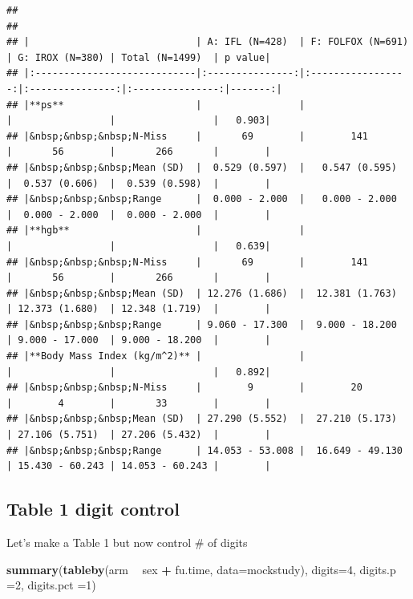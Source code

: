 \documentclass[
]{book}
\newenvironment{Shaded}{\begin{snugshade}}{\end{snugshade}}
\newcommand{\DataTypeTok}[1]{\textcolor[rgb]{0.13,0.29,0.53}{#1}}
\newcommand{\DecValTok}[1]{\textcolor[rgb]{0.00,0.00,0.81}{#1}}
\newcommand{\KeywordTok}[1]{\textcolor[rgb]{0.13,0.29,0.53}{\textbf{#1}}}
\newcommand{\NormalTok}[1]{#1}
\newcommand{\OperatorTok}[1]{\textcolor[rgb]{0.81,0.36,0.00}{\textbf{#1}}}
\newcommand{\StringTok}[1]{\textcolor[rgb]{0.31,0.60,0.02}{#1}}
\begin{document}
\begin{verbatim}
## 
## 
## |                             | A: IFL (N=428)  | F: FOLFOX (N=691) | G: IROX (N=380) | Total (N=1499)  | p value|
## |:----------------------------|:---------------:|:-----------------:|:---------------:|:---------------:|-------:|
## |**ps**                       |                 |                   |                 |                 |   0.903|
## |&nbsp;&nbsp;&nbsp;N-Miss     |       69        |        141        |       56        |       266       |        |
## |&nbsp;&nbsp;&nbsp;Mean (SD)  |  0.529 (0.597)  |   0.547 (0.595)   |  0.537 (0.606)  |  0.539 (0.598)  |        |
## |&nbsp;&nbsp;&nbsp;Range      |  0.000 - 2.000  |   0.000 - 2.000   |  0.000 - 2.000  |  0.000 - 2.000  |        |
## |**hgb**                      |                 |                   |                 |                 |   0.639|
## |&nbsp;&nbsp;&nbsp;N-Miss     |       69        |        141        |       56        |       266       |        |
## |&nbsp;&nbsp;&nbsp;Mean (SD)  | 12.276 (1.686)  |  12.381 (1.763)   | 12.373 (1.680)  | 12.348 (1.719)  |        |
## |&nbsp;&nbsp;&nbsp;Range      | 9.060 - 17.300  |  9.000 - 18.200   | 9.000 - 17.000  | 9.000 - 18.200  |        |
## |**Body Mass Index (kg/m^2)** |                 |                   |                 |                 |   0.892|
## |&nbsp;&nbsp;&nbsp;N-Miss     |        9        |        20         |        4        |       33        |        |
## |&nbsp;&nbsp;&nbsp;Mean (SD)  | 27.290 (5.552)  |  27.210 (5.173)   | 27.106 (5.751)  | 27.206 (5.432)  |        |
## |&nbsp;&nbsp;&nbsp;Range      | 14.053 - 53.008 |  16.649 - 49.130  | 15.430 - 60.243 | 14.053 - 60.243 |        |
\end{verbatim}

\hypertarget{table-1-digit-control}{%
\subsection{Table 1 digit control}\label{table-1-digit-control}}

Let's make a Table 1 but now control \# of digits

\begin{Shaded}
\begin{Highlighting}[]
\KeywordTok{summary}\NormalTok{(}\KeywordTok{tableby}\NormalTok{(arm }\OperatorTok{~}\StringTok{ }\NormalTok{sex }\OperatorTok{+}\StringTok{ }\NormalTok{fu.time, }\DataTypeTok{data=}\NormalTok{mockstudy), }\DataTypeTok{digits=}\DecValTok{4}\NormalTok{, }\DataTypeTok{digits.p =}\DecValTok{2}\NormalTok{, }\DataTypeTok{digits.pct =}\DecValTok{1}\NormalTok{)}
\end{Highlighting}
\end{Shaded}
\end{document}
